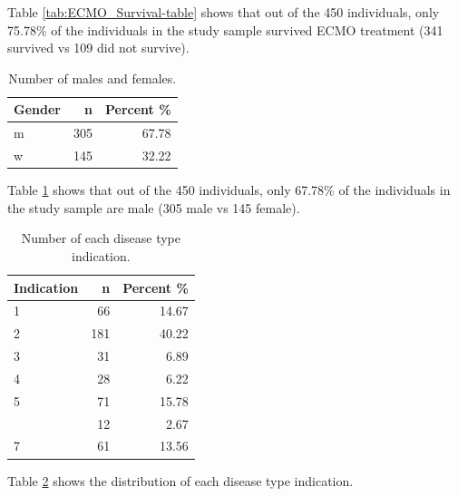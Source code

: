 \documentclass[12pt,]{article}
\begin{document}
Table \ref{tab:ECMO_Survival-table} shows that out of the 450
individuals, only 75.78\% of the individuals in the study sample
survived ECMO treatment (341 survived vs 109 did not survive).

\begin{table}[!h]

\caption{\label{tab:unnamed-chunk-4}\label{tab:gender-table} Number of males and females.}
\centering
\fontsize{10}{12}\selectfont
\begin{tabular}{lrr}
\toprule
Gender & n & Percent \%\\
\midrule
m & 305 & 67.78\\
w & 145 & 32.22\\
\bottomrule
\end{tabular}
\end{table}

Table \ref{tab:gender-table} shows that out of the 450 individuals, only
67.78\% of the individuals in the study sample are male (305 male vs 145
female).

\begin{table}[!h]

\caption{\label{tab:unnamed-chunk-5}\label{tab:indications-table} Number of each disease type indication.}
\centering
\fontsize{10}{12}\selectfont
\begin{tabular}{lrr}
\toprule
Indication & n & Percent \%\\
\midrule
1 & 66 & 14.67\\
2 & 181 & 40.22\\
3 & 31 & 6.89\\
4 & 28 & 6.22\\
5 & 71 & 15.78\\
\addlinespace
6 & 12 & 2.67\\
7 & 61 & 13.56\\
\bottomrule
\end{tabular}
\end{table}

Table \ref{tab:indications-table} shows the distribution of each disease
type indication.
\end{document}
